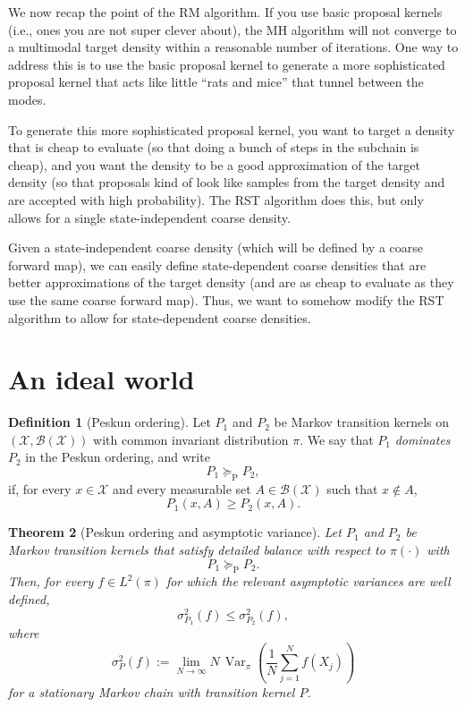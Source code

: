 \documentclass[12pt]{article}
\newtheorem{theorem}{Theorem}[section]
\theoremstyle{definition}
\newtheorem{definition}[theorem]{Definition}
\theoremstyle{remark}
\theoremstyle{plain}
\begin{document}
We now recap the point of the RM algorithm. 
If you use basic proposal kernels (i.e., ones you are not super clever about), 
the MH algorithm will not converge to a multimodal target density within a reasonable number of iterations.
One way to address this is to use the basic proposal kernel to generate a more 
sophisticated proposal kernel that acts like little ``rats and mice'' that tunnel between the modes. 

To generate this more sophisticated proposal kernel, you want to target a density that is cheap to evaluate 
(so that doing a bunch of steps in the subchain is cheap), and you want the density to be a good approximation 
of the target density (so that proposals kind of look like samples from the target density and are accepted with high probability). 
The RST algorithm does this, but only allows for a single state-independent coarse density.

Given a state-independent coarse density (which will be defined by a coarse forward map), we can easily 
define state-dependent coarse densities that are better approximations of the target density 
(and are as cheap to evaluate as they use the same coarse forward map).
Thus, 
we want to somehow modify the RST algorithm to allow for state-dependent coarse densities.


\section{An ideal world}

\begin{definition}[Peskun ordering]
Let $P_1$ and $P_2$ be Markov transition kernels on
$(\mathcal X,\mathcal B(\mathcal X))$ with common invariant distribution
$\pi$. We say that $P_1$ \emph{dominates} $P_2$ in the Peskun ordering,
and write
\[
P_1 \succeq_{\mathrm P} P_2,
\]
if, for every $x\in\mathcal X$ and every measurable set
$A\in\mathcal B(\mathcal X)$ such that $x\notin A$,
\[
P_1(x,A)\geq P_2(x,A).
\]
\end{definition}

\begin{theorem}[Peskun ordering and asymptotic variance]
Let $P_1$ and $P_2$ 
be Markov transition kernels that
satisfy detailed balance with respect to $\pi(\cdot)$ with
\[
P_1 \succeq_{\mathrm P} P_2.
\]
Then, for every $f\in L^2(\pi)$ for which the relevant asymptotic
variances are well defined,
\[
\sigma_{P_1}^2(f)
\leq
\sigma_{P_2}^2(f),
\]
where
\[
\sigma_P^2(f)
:=
\lim_{N\to\infty}
N\,
\operatorname{Var}_{\pi}\left(
\frac{1}{N}\sum_{j=1}^N f(X_j)
\right)
\]
for a stationary Markov chain with transition kernel $P$.
\end{theorem}
\end{document}
